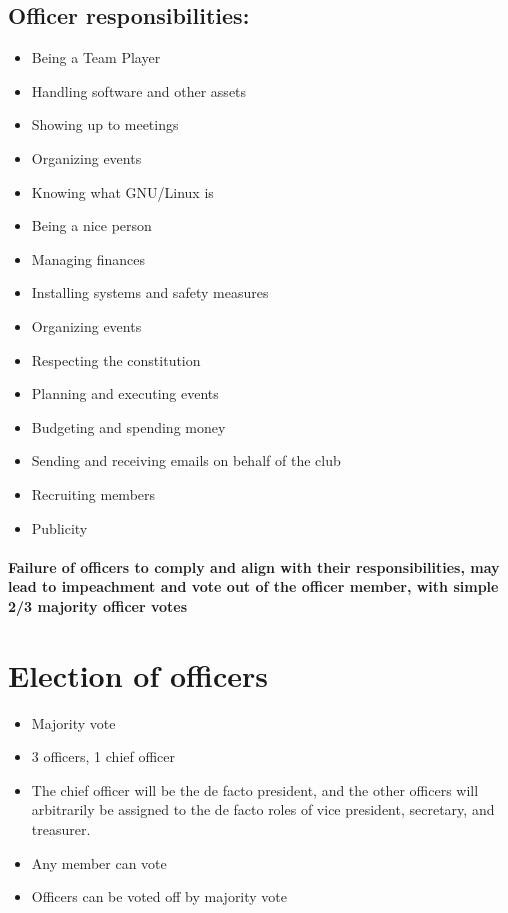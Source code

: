 \documentclass[a4paper, 11pt]{amsart}
\begin{document}
\subsection{Officer responsibilities:}
\begin{itemize}
    \item Being a Team Player
    \item Handling software and other assets
    \item Showing up to meetings
    \item Organizing events
    \item Knowing what GNU/Linux is
    \item Being a nice person
    \item Managing finances
    \item Installing systems and safety measures
    \item Organizing events
    \item Respecting the constitution
    \item Planning and executing events
    \item Budgeting and spending money
    \item Sending and receiving emails on behalf of the club
    \item Recruiting members
    \item Publicity
\end{itemize}
\paragraph{Failure of officers to comply and align with their responsibilities, may lead to impeachment and vote out of the officer member, with simple 2/3 majority officer votes}


\section{Election of officers}
\begin{itemize}
    \item Majority vote
    \item 3 officers, 1 chief officer
    \item The chief officer will be the de facto president, and the other officers will arbitrarily be assigned to the de facto roles of vice president, secretary, and treasurer.
    \item Any member can vote
    \item Officers can be voted off by majority vote
\end{itemize}
\end{document}
